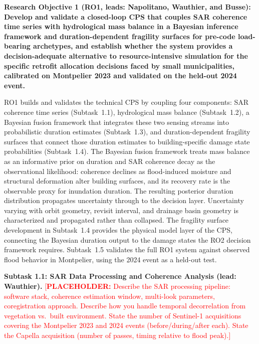 \documentclass[11pt]{article}
\newcommand{\placeholder}[1]{\textcolor{red}{[\textbf{PLACEHOLDER:} #1]}}
\begin{document}
\begin{tcolorbox}[colback=mycmykcolor,colframe=black,boxrule=1pt,coltext=black,
  left=1mm,right=1mm,top=1mm,bottom=1mm]
\textbf{Research Objective 1 (RO1, leads: Napolitano, Wauthier, and Busse): Develop and validate a closed-loop CPS that couples SAR coherence time series with hydrological mass balance in a Bayesian inference framework and duration-dependent fragility surfaces for pre-code load-bearing archetypes, and establish whether the system provides a decision-adequate alternative to resource-intensive simulation for the specific retrofit allocation decisions faced by small municipalities, calibrated on Montpelier 2023 and validated on the held-out 2024 event.}
\end{tcolorbox}

RO1 builds and validates the technical CPS by coupling four components: SAR coherence time series (Subtask~1.1), hydrological mass balance (Subtask~1.2), a Bayesian fusion framework that integrates these two sensing streams into probabilistic duration estimates (Subtask~1.3), and duration-dependent fragility surfaces that connect those duration estimates to building-specific damage state probabilities (Subtask~1.4).
The Bayesian fusion framework treats mass balance as an informative prior on duration and SAR coherence decay as the observational likelihood: coherence declines as flood-induced moisture and structural deformation alter building surfaces, and its recovery rate is the observable proxy for inundation duration.
The resulting posterior duration distribution propagates uncertainty through to the decision layer.
Uncertainty varying with orbit geometry, revisit interval, and drainage basin geometry is characterized and propagated rather than collapsed.
The fragility surface development in Subtask~1.4 provides the physical model layer of the CPS, connecting the Bayesian duration output to the damage states the RO2 decision framework requires.
Subtask~1.5 validates the full RO1 system against observed flood behavior in Montpelier, using the 2024 event as a held-out test.

\textbf{Subtask 1.1: SAR Data Processing and Coherence Analysis (lead: Wauthier).}
\placeholder{Describe the SAR processing pipeline: software stack, coherence estimation window, multi-look parameters, coregistration approach. Describe how you handle temporal decorrelation from vegetation vs.\ built environment. State the number of Sentinel-1 acquisitions covering the Montpelier 2023 and 2024 events (before/during/after each). State the Capella acquisition (number of passes, timing relative to flood peak).}
\end{document}
